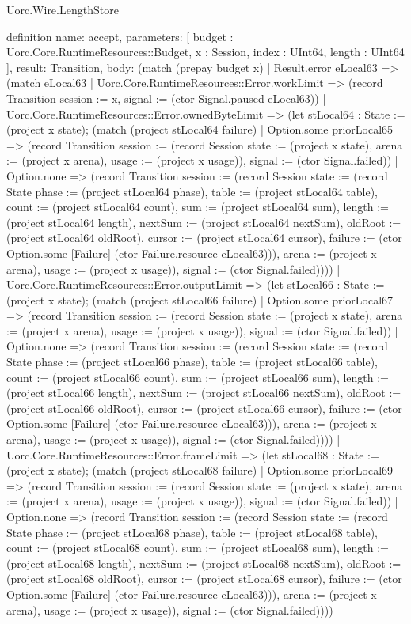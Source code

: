 \begin{lexlean}{Uorc.Wire.LengthStore}
\begin{semanticmodule}
definition{
  name: accept,
  parameters: [
    budget : Uorc.Core.RuntimeResources::Budget,
    x : Session,
    index : UInt64,
    length : UInt64
  ],
  result: Transition,
  body: (match (prepay budget x)
    | Result.error eLocal63 => (match eLocal63
      | Uorc.Core.RuntimeResources::Error.workLimit => (record Transition {session := x, signal := (ctor Signal.paused eLocal63)})
      | Uorc.Core.RuntimeResources::Error.ownedByteLimit => (let stLocal64 : State := (project x state); (match (project stLocal64 failure)
        | Option.some priorLocal65 => (record Transition {session := (record Session {state := (project x state), arena := (project x arena), usage := (project x usage)}), signal := (ctor Signal.failed)})
        | Option.none => (record Transition {session := (record Session {state := (record State {phase := (project stLocal64 phase), table := (project stLocal64 table), count := (project stLocal64 count), sum := (project stLocal64 sum), length := (project stLocal64 length), nextSum := (project stLocal64 nextSum), oldRoot := (project stLocal64 oldRoot), cursor := (project stLocal64 cursor), failure := (ctor Option.some [Failure] (ctor Failure.resource eLocal63))}), arena := (project x arena), usage := (project x usage)}), signal := (ctor Signal.failed)})))
      | Uorc.Core.RuntimeResources::Error.outputLimit => (let stLocal66 : State := (project x state); (match (project stLocal66 failure)
        | Option.some priorLocal67 => (record Transition {session := (record Session {state := (project x state), arena := (project x arena), usage := (project x usage)}), signal := (ctor Signal.failed)})
        | Option.none => (record Transition {session := (record Session {state := (record State {phase := (project stLocal66 phase), table := (project stLocal66 table), count := (project stLocal66 count), sum := (project stLocal66 sum), length := (project stLocal66 length), nextSum := (project stLocal66 nextSum), oldRoot := (project stLocal66 oldRoot), cursor := (project stLocal66 cursor), failure := (ctor Option.some [Failure] (ctor Failure.resource eLocal63))}), arena := (project x arena), usage := (project x usage)}), signal := (ctor Signal.failed)})))
      | Uorc.Core.RuntimeResources::Error.frameLimit => (let stLocal68 : State := (project x state); (match (project stLocal68 failure)
        | Option.some priorLocal69 => (record Transition {session := (record Session {state := (project x state), arena := (project x arena), usage := (project x usage)}), signal := (ctor Signal.failed)})
        | Option.none => (record Transition {session := (record Session {state := (record State {phase := (project stLocal68 phase), table := (project stLocal68 table), count := (project stLocal68 count), sum := (project stLocal68 sum), length := (project stLocal68 length), nextSum := (project stLocal68 nextSum), oldRoot := (project stLocal68 oldRoot), cursor := (project stLocal68 cursor), failure := (ctor Option.some [Failure] (ctor Failure.resource eLocal63))}), arena := (project x arena), usage := (project x usage)}), signal := (ctor Signal.failed)})))
}
\end{semanticmodule}
\end{lexlean}
